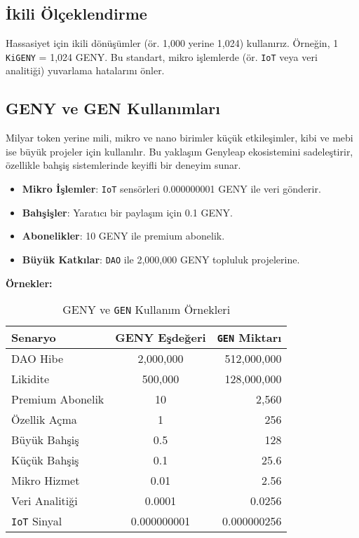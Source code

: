 \documentclass[a4paper,12pt,openany]{book}
\begin{document}
\subsection*{İkili Ölçeklendirme}
Hassasiyet için ikili dönüşümler (ör. 1,000 yerine 1,024) kullanırız. Örneğin, 1 \texttt{KiGENY} = 1,024 GENY. Bu standart, mikro işlemlerde (ör. \texttt{IoT} veya veri analitiği) yuvarlama hatalarını önler.

\subsection*{GENY ve GEN Kullanımları}
Milyar token yerine mili, mikro ve nano birimler küçük etkileşimler, kibi ve mebi ise büyük projeler için kullanılır. Bu yaklaşım Genyleap ekosistemini sadeleştirir, özellikle bahşiş sistemlerinde keyifli bir deneyim sunar.
\begin{itemize}
    \item \textbf{Mikro İşlemler}: \texttt{IoT} sensörleri 0.000000001 GENY ile veri gönderir.
    \item \textbf{Bahşişler}: Yaratıcı bir paylaşım için 0.1 GENY.
    \item \textbf{Abonelikler}: 10 GENY ile premium abonelik.
    \item \textbf{Büyük Katkılar}: \texttt{DAO} ile 2,000,000 GENY topluluk projelerine.
\end{itemize}

\textbf{Örnekler:}
\begin{table}[h]
\centering
\caption{GENY ve \texttt{GEN} Kullanım Örnekleri}
\small
\begin{tabular}{l c r}
\hline
\textbf{Senaryo} & \textbf{GENY Eşdeğeri} & \textbf{\texttt{GEN} Miktarı} \\
\hline
DAO Hibe & 2,000,000 & 512,000,000 \\
Likidite & 500,000 & 128,000,000 \\
Premium Abonelik & 10 & 2,560 \\
Özellik Açma & 1 & 256 \\
Büyük Bahşiş & 0.5 & 128 \\
Küçük Bahşiş & 0.1 & 25.6 \\
Mikro Hizmet & 0.01 & 2.56 \\
Veri Analitiği & 0.0001 & 0.0256 \\
\texttt{IoT} Sinyal & 0.000000001 & 0.000000256 \\
\hline
\end{tabular}
\end{table}
\end{document}
